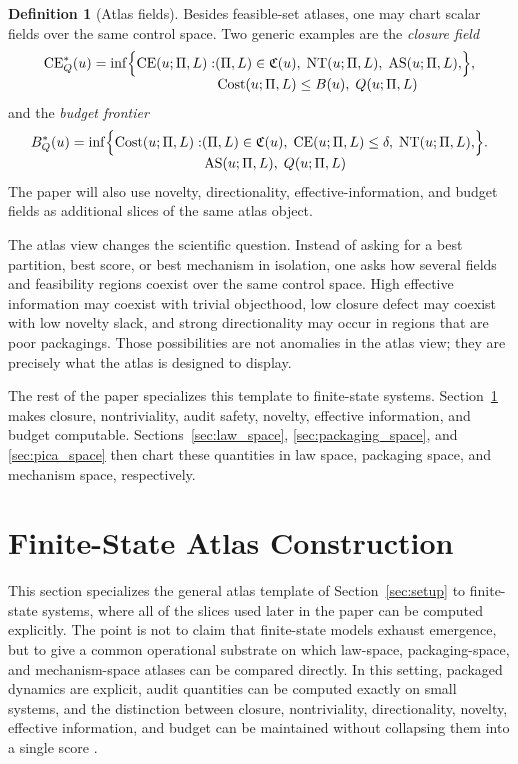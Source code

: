 \documentclass[11pt]{article}
\theoremstyle{definition}
\newtheorem{definition}{Definition}[section]
\begin{document}
\begin{definition}[Atlas fields]\label{def:atlas_fields}
Besides feasible-set atlases, one may chart scalar fields over the same control space. Two generic examples are the \emph{closure field}
\[
\operatorname{CE}^{\ast}_{Q}(u)
=
\inf
\Bigl\{
\begin{aligned}[t]
\operatorname{CE}(u;\Pi,L)
:&
(\Pi,L)\in\mathfrak{C}(u),\;
\operatorname{NT}(u;\Pi,L),\;
\operatorname{AS}(u;\Pi,L),\\
&
\operatorname{Cost}(u;\Pi,L)\le B(u),\;
Q(u;\Pi,L)
\end{aligned}
\Bigr\},
\]
and the \emph{budget frontier}
\[
B^{\ast}_{Q}(u)
=
\inf
\Bigl\{
\begin{aligned}[t]
\operatorname{Cost}(u;\Pi,L)
:&
(\Pi,L)\in\mathfrak{C}(u),\;
\operatorname{CE}(u;\Pi,L)\le \delta,\;
\operatorname{NT}(u;\Pi,L),\\
&
\operatorname{AS}(u;\Pi,L),\;
Q(u;\Pi,L)
\end{aligned}
\Bigr\}.
\]
The paper will also use novelty, directionality, effective-information, and budget fields as additional slices of the same atlas object.
\end{definition}

The atlas view changes the scientific question. Instead of asking for a best partition, best score, or best mechanism in isolation, one asks how several fields and feasibility regions coexist over the same control space. High effective information may coexist with trivial objecthood, low closure defect may coexist with low novelty slack, and strong directionality may occur in regions that are poor packagings. Those possibilities are not anomalies in the atlas view; they are precisely what the atlas is designed to display.

The rest of the paper specializes this template to finite-state systems. Section~\ref{sec:finite_state} makes closure, nontriviality, audit safety, novelty, effective information, and budget computable. Sections~\ref{sec:law_space}, \ref{sec:packaging_space}, and \ref{sec:pica_space} then chart these quantities in law space, packaging space, and mechanism space, respectively.
 \section{Finite-State Atlas Construction}\label{sec:finite_state}

This section specializes the general atlas template of Section~\ref{sec:setup} to finite-state systems, where all of the slices used later in the paper can be computed explicitly. The point is not to claim that finite-state models exhaust emergence, but to give a common operational substrate on which law-space, packaging-space, and mechanism-space atlases can be compared directly. In this setting, packaged dynamics are explicit, audit quantities can be computed exactly on small systems, and the distinction between closure, nontriviality, directionality, novelty, effective information, and budget can be maintained without collapsing them into a single score \cite{tsiokos2026_lay,tsiokos2026_foundations,kemeny1960finite,buchholz1994lumpability,hilder2024quantitative}.
\end{document}
